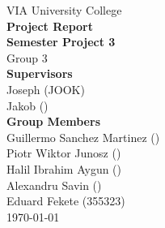 \thispagestyle{empty}
\vspace*{0.15\textheight}
\begin{center}
    {\Large VIA University College}\\[2em]
    {\huge \textbf{Project Report}}\\[0.5em]
    {\Large \textbf{Semester Project 3}}\\[0.5em]
    {\Large Group 3}\\[3em]
    {\large \textbf{Supervisors}}\\[0.5em]
    {\large Joseph (JOOK)}\\[0.5em]
    {\large Jakob ()}\\[2em]
    {\large \textbf{Group Members}}\\[0.5em]
    {\large Guillermo Sanchez Martinez ()}\\[0.5em]
    {\large Piotr Wiktor Junosz ()}\\[0.5em]
    {\large Halil Ibrahim Aygun ()}\\[0.5em]
    {\large Alexandru Savin ()}\\[0.5em]
    {\large Eduard Fekete (355323)}\\[2em]
    {\large \today}
\end{center}
\vfill
\clearpage